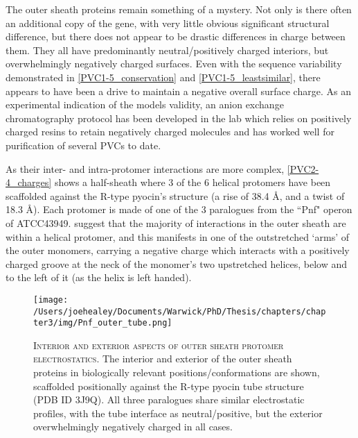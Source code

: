 The outer sheath proteins remain something of a mystery. Not only is there often an additional copy of the gene, with very little obvious significant structural difference, but there does not appear to be drastic differences in charge between them. They all have predominantly neutral/positively charged interiors, but overwhelmingly negatively charged surfaces. Even with the sequence variability demonstrated in \vref{PVC1-5_conservation} and \ref{PVC1-5_leastsimilar}, there appears to have been a drive to maintain a negative overall surface charge. As an experimental indication of the models validity, an anion exchange chromatography protocol has been developed in the lab which relies on positively charged resins to retain negatively charged molecules and has worked well for purification of several PVCs to date.

As their inter- and intra-protomer interactions are more complex, \vref{PVC2-4_charges} shows a half-sheath where 3 of the 6 helical protomers have been scaffolded against the R-type pyocin's structure (a rise of 38.4 \AA, and a twist of 18.3 \AA). Each protomer is made of one of the 3 paralogues from the ``Pnf" operon of ATCC43949. \cite{Ge2015} suggest that the majority of interactions in the outer sheath are within a helical protomer, and this manifests in one of the outstretched `arms' of the outer monomers, carrying a negative charge which interacts with a positively charged groove at the neck of the monomer's two upstretched helices, below and to the left of it (as the helix is left handed).

\begin{figure}[p]
 \centering
   \texttt{[image: /Users/joehealey/Documents/Warwick/PhD/Thesis/chapters/chapter3/img/Pnf\_outer\_tube.png]}
 \captionsetup{singlelinecheck=off, justification=justified, font=footnotesize, aboveskip=10pt}
 \caption[Electrostatic tube strata interfaces]{\textsc{\normalsize Interior and exterior aspects of outer sheath protomer electrostatics.}\vspace{0.1cm} \newline The interior and exterior of the outer sheath proteins in biologically relevant positions/conformations are shown, scaffolded positionally against the R-type pyocin tube structure (PDB ID 3J9Q). All three paralogues share similar electrostatic profiles, with the tube interface as neutral/positive, but the exterior overwhelmingly negatively charged in all cases.}
 \label{PVC2-4_charges}
\end{figure}


